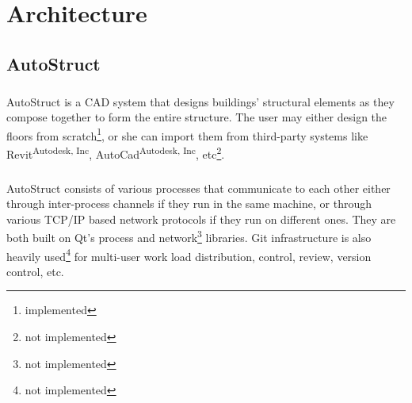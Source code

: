 \chapter{Architecture}
\section{AutoStruct}
\paragraph{}
AutoStruct is a CAD system that designs buildings' structural elements as they compose together to form the entire structure. The user may either design the floors from scratch\footnote{implemented}, or she can import them from third-party systems like Revit\textsuperscript{Autodesk, Inc}, AutoCad\textsuperscript{Autodesk, Inc}, etc\footnote{not implemented}. 
\paragraph{}
AutoStruct consists of various processes that communicate to each other either through inter-process channels if they run in the same machine, or through various TCP/IP based network protocols if they run on different ones. They are both built on Qt's process and network\footnote{not implemented} libraries. Git infrastructure is also heavily used\footnote{not implemented} for multi-user work load distribution, control, review, version control, etc.
